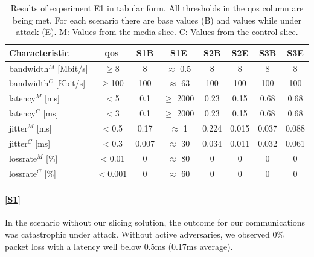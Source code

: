 \begin{description}[style=multiline, labelwidth=0.7cm]
    \begin{table}[ht]
        \centering
        \begin{tabular}{|l|c|c|c|c|c|c|c|}
            \hline
            \textbf{Characteristic}      & \textbf{\acrshort{qos}} & \textbf{S1B} & \textbf{S1E}  & \textbf{S2B} & \textbf{S2E} & \textbf{S3B} & \textbf{S3E} \\
            \hline
            \Gls{bandwidth}$^M$ [Mbit/s] & $\geq$8                 & 8            & $\approx$ 0.5 & 8            & 8            & 8            & 8            \\
            \Gls{bandwidth}$^C$ [Kbit/s] & $\geq$100               & 100          & $\approx$ 63  & 100          & 100          & 100          & 100          \\
            \hline
            \Gls{latency}$^M$ [ms]       & $<$5                    & 0.1          & $\geq$ 2000   & 0.23         & 0.15         & 0.68         & 0.68         \\
            \Gls{latency}$^C$ [ms]       & $<$3                    & 0.1          & $\geq$ 2000   & 0.23         & 0.15         & 0.68         & 0.68         \\
            \hline
            \Gls{jitter}$^M$ [ms]        & $<$0.5                  & 0.17         & $\approx$ 1   & 0.224        & 0.015        & 0.037        & 0.088        \\
            \Gls{jitter}$^C$ [ms]        & $<$0.3                  & 0.007        & $\approx$ 30  & 0.034        & 0.011        & 0.032        & 0.061        \\
            \hline
            \Gls{lossrate}$^M$ [\%]      & $<$0.01                 & 0            & $\approx$ 80  & 0            & 0            & 0            & 0            \\
            \Gls{lossrate}$^C$ [\%]      & $<$0.001                & 0            & $\approx$ 60  & 0            & 0            & 0            & 0            \\
            \hline
        \end{tabular}
        \caption[Results of experiment E1]{Results of experiment E1 in tabular form. All thresholds in the \acrshort{qos} column are being met. For each scenario there are base values (B) and values while under attack (E). M: Values from the media slice. C: Values from the control slice.}
        \label{table:validation_qos_results}
    \end{table}

    \paragraph{\ref{S1}} In the scenario without our slicing solution, the outcome for our communications was catastrophic under attack. Without active adversaries, we observed 0\% packet loss with a \gls{latency} well below 0.5ms (0.17ms average).


\end{description}
